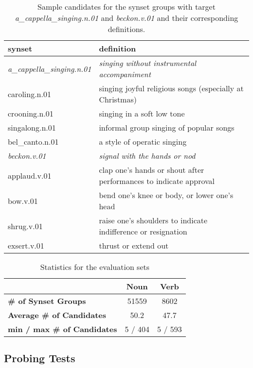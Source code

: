 \documentclass[11pt,a4paper]{article}
\begin{document}
\begin{table*}
    \centering
    \begin{tabular}{l|l}
    \hline
    \textbf{synset} & \textbf{definition} \\ \hline
    \emph{a\_cappella\_singing.n.01} & \emph{singing without instrumental accompaniment} \\
     caroling.n.01 & singing joyful religious songs (especially at Christmas) \\
     crooning.n.01 & singing in a soft low tone \\
     singalong.n.01 & informal group singing of popular songs \\
     bel\_canto.n.01 & a style of operatic singing \\ \hline
     \emph{beckon.v.01} & \emph{signal with the hands or nod} \\
     applaud.v.01 & clap one's hands or shout after performances to indicate approval \\
     bow.v.01 & bend one's knee or body, or lower one's head \\
     shrug.v.01 & raise one's shoulders to indicate indifference or resignation \\
     exsert.v.01 & thrust or extend out \\ \hline
   
    \end{tabular}
    \caption{Sample candidates for the synset groups with target \emph{a\_cappella\_singing.n.01} and \emph{beckon.v.01} and their corresponding definitions.} 
    \label{tab:dataset_samples}
\end{table*}


\begin{table}
    \centering
    \begin{tabular}{l|cc}
    \hline
         & \textbf{Noun} & \textbf{Verb} \\ \hline
         \textbf{\# of Synset Groups} & 51559 & 8602 \\
         \textbf{Average \# of Candidates} & 50.2 & 47.7 \\
         \textbf{min / max \# of Candidates} & 5 / 404 & 5 / 593 \\ \hline
    \end{tabular}
    \caption{Statistics for the evaluation sets}
    \label{tab:dataset_stats}
\end{table}

\subsection{Probing Tests}
\end{document}
